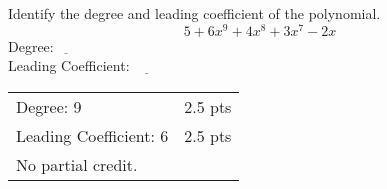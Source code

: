
{
	Identify the degree and leading coefficient of the polynomial. $$5+6x^9+4x^8+3x^7-2x$$
	Degree:$\underline{~~~~~~~~}$ \\
	Leading Coefficient: $\underline{~~~~~~~~}$
}
{
	\begin{tabular}{l r}
	Degree: 9 & 2.5 pts\\
	Leading Coefficient: 6 & 2.5 pts \\
	No partial credit.
	\end{tabular}
}
